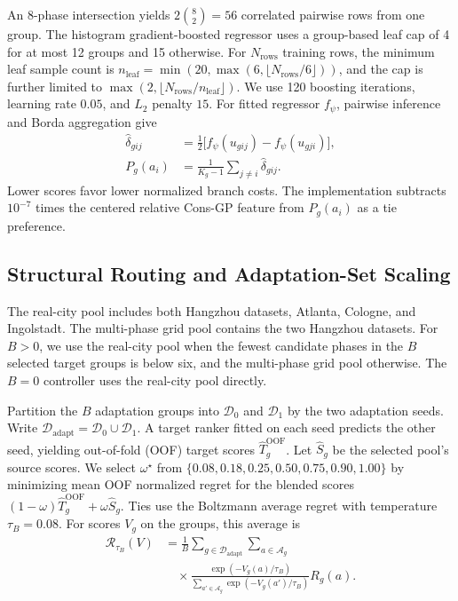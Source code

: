 \documentclass[letterpaper,journal]{IEEEtran}
\begin{document}
An $8$-phase intersection yields $2\binom{8}{2}=56$ correlated pairwise rows from one group. The histogram gradient-boosted regressor \cite{friedman2001greedy,pedregosa2011scikit} uses a group-based leaf cap of 4 for at most 12 groups and 15 otherwise. For $N_{\mathrm{rows}}$ training rows, the minimum leaf sample count is $n_{\mathrm{leaf}}=\min(20,\max(6,\lfloor N_{\mathrm{rows}}/6\rfloor))$, and the cap is further limited to $\max(2,\lfloor N_{\mathrm{rows}}/n_{\mathrm{leaf}}\rfloor)$. We use 120 boosting iterations, learning rate $0.05$, and $L_2$ penalty $15$. For fitted regressor $f_\psi$, pairwise inference and Borda aggregation give
\begin{align}
  \widehat{\delta}_{gij} &= \tfrac{1}{2}\bigl[f_\psi(u_{gij})-f_\psi(u_{gji})\bigr],\label{eq:antisym}\\
  P_g(a_i) &= \frac{1}{K_g-1}\sum_{j\ne i}\widehat{\delta}_{gij}.\label{eq:borda}
\end{align}
Lower scores favor lower normalized branch costs. The implementation subtracts $10^{-7}$ times the centered relative Cons-GP feature from $P_g(a_i)$ as a tie preference.

\subsection{Structural Routing and Adaptation-Set Scaling}
The real-city pool includes both Hangzhou datasets, Atlanta, Cologne, and Ingolstadt. The multi-phase grid pool contains the two Hangzhou datasets. For $B>0$, we use the real-city pool when the fewest candidate phases in the $B$ selected target groups is below six, and the multi-phase grid pool otherwise. The $B=0$ controller uses the real-city pool directly.

Partition the $B$ adaptation groups into $\mathcal{D}_0$ and $\mathcal{D}_1$ by the two adaptation seeds. Write $\mathcal{D}_{\mathrm{adapt}}=\mathcal{D}_0\cup\mathcal{D}_1$. A target ranker fitted on each seed predicts the other seed, yielding out-of-fold (OOF) target scores $\widehat T_g^{\mathrm{OOF}}$. Let $\widehat S_g$ be the selected pool's source scores. We select $\omega^\star$ from $\{0.08,0.18,0.25,0.50,0.75,0.90,1.00\}$ by minimizing mean OOF normalized regret for the blended scores $(1-\omega)\widehat T_g^{\mathrm{OOF}}+\omega\widehat S_g$. Ties use the Boltzmann average regret with temperature $\tau_B=0.08$. For scores $V_g$ on the groups, this average is
\begin{equation}
\begin{split}
  \mathcal{R}_{\tau_B}(V)
     &=\frac{1}{B}\sum_{g\in\mathcal{D}_{\mathrm{adapt}}}
       \sum_{a\in\mathcal{A}_g}\\
     &\quad\times\frac{\exp(-V_g(a)/\tau_B)}
       {\sum_{a'\in\mathcal{A}_g}\exp(-V_g(a')/\tau_B)}R_g(a).
\end{split}
  \label{eq:boltzmann}
\end{equation}
\end{document}
